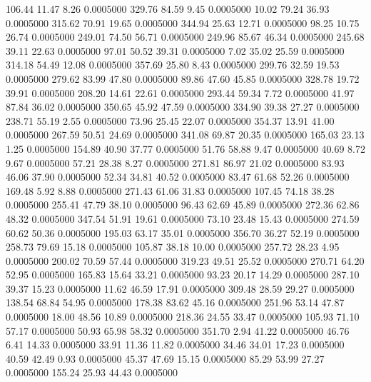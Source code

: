  106.44   11.47    8.26   0.0005000
 329.76   84.59    9.45   0.0005000
  10.02   79.24   36.93   0.0005000
 315.62   70.91   19.65   0.0005000
 344.94   25.63   12.71   0.0005000
  98.25   10.75   26.74   0.0005000
 249.01   74.50   56.71   0.0005000
 249.96   85.67   46.34   0.0005000
 245.68   39.11   22.63   0.0005000
  97.01   50.52   39.31   0.0005000
   7.02   35.02   25.59   0.0005000
 314.18   54.49   12.08   0.0005000
 357.69   25.80    8.43   0.0005000
 299.76   32.59   19.53   0.0005000
 279.62   83.99   47.80   0.0005000
  89.86   47.60   45.85   0.0005000
 328.78   19.72   39.91   0.0005000
 208.20   14.61   22.61   0.0005000
 293.44   59.34    7.72   0.0005000
  41.97   87.84   36.02   0.0005000
 350.65   45.92   47.59   0.0005000
 334.90   39.38   27.27   0.0005000
 238.71   55.19    2.55   0.0005000
  73.96   25.45   22.07   0.0005000
 354.37   13.91   41.00   0.0005000
 267.59   50.51   24.69   0.0005000
 341.08   69.87   20.35   0.0005000
 165.03   23.13    1.25   0.0005000
 154.89   40.90   37.77   0.0005000
  51.76   58.88    9.47   0.0005000
  40.69    8.72    9.67   0.0005000
  57.21   28.38    8.27   0.0005000
 271.81   86.97   21.02   0.0005000
  83.93   46.06   37.90   0.0005000
  52.34   34.81   40.52   0.0005000
  83.47   61.68   52.26   0.0005000
 169.48    5.92    8.88   0.0005000
 271.43   61.06   31.83   0.0005000
 107.45   74.18   38.28   0.0005000
 255.41   47.79   38.10   0.0005000
  96.43   62.69   45.89   0.0005000
 272.36   62.86   48.32   0.0005000
 347.54   51.91   19.61   0.0005000
  73.10   23.48   15.43   0.0005000
 274.59   60.62   50.36   0.0005000
 195.03   63.17   35.01   0.0005000
 356.70   36.27   52.19   0.0005000
 258.73   79.69   15.18   0.0005000
 105.87   38.18   10.00   0.0005000
 257.72   28.23    4.95   0.0005000
 200.02   70.59   57.44   0.0005000
 319.23   49.51   25.52   0.0005000
 270.71   64.20   52.95   0.0005000
 165.83   15.64   33.21   0.0005000
  93.23   20.17   14.29   0.0005000
 287.10   39.37   15.23   0.0005000
  11.62   46.59   17.91   0.0005000
 309.48   28.59   29.27   0.0005000
 138.54   68.84   54.95   0.0005000
 178.38   83.62   45.16   0.0005000
 251.96   53.14   47.87   0.0005000
  18.00   48.56   10.89   0.0005000
 218.36   24.55   33.47   0.0005000
 105.93   71.10   57.17   0.0005000
  50.93   65.98   58.32   0.0005000
 351.70    2.94   41.22   0.0005000
  46.76    6.41   14.33   0.0005000
  33.91   11.36   11.82   0.0005000
  34.46   34.01   17.23   0.0005000
  40.59   42.49    0.93   0.0005000
  45.37   47.69   15.15   0.0005000
  85.29   53.99   27.27   0.0005000
 155.24   25.93   44.43   0.0005000
